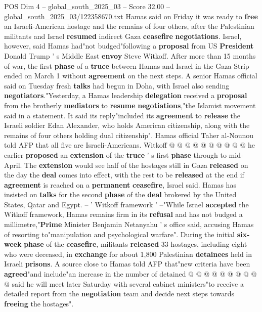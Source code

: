 \begin{textsample}{POS Dim 4 – global\_south\_2025\_03 – Score 32.00 – global\_south\_2025\_03/122358670.txt}  \label{ex:f4_pos_034}
Hamas said on Friday it was ready to \textbf{free} an Israeli-American hostage and the remains of four others, after the Palestinian militants and Israel \textbf{resumed} indirect Gaza \textbf{ceasefire} \textbf{negotiations}.
Israel, however, said Hamas had"not budged"following a \textbf{proposal} from US \textbf{President} Donald Trump ' s Middle East \textbf{envoy} Steve Witkoff.
After more than 15 months of war, the first \textbf{phase} of a \textbf{truce} between Hamas and Israel in the Gaza Strip ended on March 1 without \textbf{agreement} on the next steps.
A senior Hamas official said on Tuesday fresh \textbf{talks} had begun in Doha, with Israel also sending \textbf{negotiators}."Yesterday, a Hamas leadership \textbf{delegation} received a \textbf{proposal} from the brotherly \textbf{mediators} to \textbf{resume} \textbf{negotiations},"the Islamist movement said in a statement.
It said its reply"included its \textbf{agreement} to \textbf{release} the Israeli soldier Edan Alexander, who holds American citizenship, along with the remains of four others holding dual citizenship".
Hamas official Taher al-Nounou told AFP that all five are Israeli-Americans.
Witkoff @ @ @ @ @ @ @ @ @ @ he earlier \textbf{proposed} an \textbf{extension} of the \textbf{truce} ' s first \textbf{phase} through to mid-April.
The \textbf{extension} would see half of the hostages still in Gaza \textbf{released} on the day the \textbf{deal} comes into effect, with the rest to be \textbf{released} at the end if \textbf{agreement} is reached on a \textbf{permanent} \textbf{ceasefire}, Israel said.
Hamas has insisted on \textbf{talks} for the second \textbf{phase} of the \textbf{deal} brokered by the United States, Qatar and Egypt. -- ' Witkoff framework ' --"While Israel \textbf{accepted} the Witkoff framework, Hamas remains firm in its \textbf{refusal} and has not budged a millimetre,"\textbf{Prime} Minister Benjamin Netanyahu ' s office said, accusing Hamas of resorting to"manipulation and psychological warfare".
During the initial \textbf{six-week} \textbf{phase} of the \textbf{ceasefire}, militants \textbf{released} 33 hostages, including eight who were deceased, in \textbf{exchange} for about 1,800 Palestinian \textbf{detainees} held in Israeli \textbf{prisons}.
A source close to Hamas told AFP that"new criteria have been \textbf{agreed}"and include"an increase in the number of detained @ @ @ @ @ @ @ @ @ @ said he will meet later Saturday with several cabinet ministers"to receive a detailed report from the \textbf{negotiation} team and decide next steps towards \textbf{freeing} the hostages".

\end{textsample}
